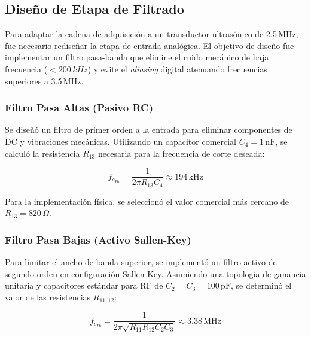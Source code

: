 \documentclass[12pt,letterpaper]{article}
\begin{document}

\subsection{Diseño de Etapa de Filtrado}
Para adaptar la cadena de adquisición a un transductor ultrasónico de 2.5\,MHz, fue necesario rediseñar la etapa de entrada analógica. El objetivo de diseño fue implementar un filtro pasa-banda que elimine el ruido mecánico de baja frecuencia ($<200\,kHz$) y evite el \textit{aliasing} digital atenuando frecuencias superiores a 3.5\,MHz.

\subsubsection{Filtro Pasa Altas (Pasivo RC)}
Se diseñó un filtro de primer orden a la entrada para eliminar componentes de DC y vibraciones mecánicas. Utilizando un capacitor comercial $C_4 = 1\,\text{nF}$, se calculó la resistencia $R_{13}$ necesaria para la frecuencia de corte deseada:

\begin{equation}
    f_{c_{Pa}} = \frac{1}{2\pi R_{13} C_4} \approx 194\,\text{kHz}
\end{equation}

Para la implementación física, se seleccionó el valor comercial más cercano de $R_{13} = 820\,\Omega$.

\subsubsection{Filtro Pasa Bajas (Activo Sallen-Key)}
Para limitar el ancho de banda superior, se implementó un filtro activo de segundo orden en configuración Sallen-Key. Asumiendo una topología de ganancia unitaria y capacitores estándar para RF de $C_2=C_3=100\,\text{pF}$, se determinó el valor de las resistencias $R_{11,12}$:

\begin{equation}
    f_{c_{Pb}} = \frac{1}{2\pi \sqrt{R_{11}R_{12}C_2 C_3}} \approx 3.38\,\text{MHz}
\end{equation}
\end{document}
